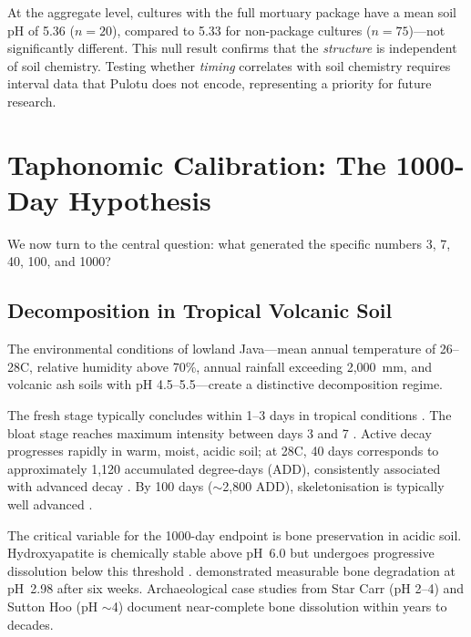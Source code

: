 \documentclass[12pt,a4paper]{article}
\begin{document}
At the aggregate level, cultures with the full mortuary package have a mean soil pH of 5.36 ($n = 20$), compared to 5.33 for non-package cultures ($n = 75$)---not significantly different. This null result confirms that the \textit{structure} is independent of soil chemistry. Testing whether \textit{timing} correlates with soil chemistry requires interval data that Pulotu does not encode, representing a priority for future research.


\section{Taphonomic Calibration: The 1000-Day Hypothesis}

We now turn to the central question: what generated the specific numbers 3, 7, 40, 100, and 1000?

\subsection{Decomposition in Tropical Volcanic Soil}

The environmental conditions of lowland Java---mean annual temperature of 26--28\textdegree C, relative humidity above 70\%, annual rainfall exceeding 2,000~mm, and volcanic ash soils with pH 4.5--5.5---create a distinctive decomposition regime.

The fresh stage typically concludes within 1--3 days in tropical conditions \citep{rodriguez_bass_1985, galloway_1997}. The bloat stage reaches maximum intensity between days 3 and 7 \citep{galloway_1989, vass_2001}. Active decay progresses rapidly in warm, moist, acidic soil; at 28\textdegree C, 40 days corresponds to approximately 1,120 accumulated degree-days (ADD), consistently associated with advanced decay \citep{megyesi_2005}. By 100 days ($\sim$2,800 ADD), skeletonisation is typically well advanced \citep{haglund_sorg_1997}.

The critical variable for the 1000-day endpoint is bone preservation in acidic soil. Hydroxyapatite is chemically stable above pH~6.0 but undergoes progressive dissolution below this threshold \citep{nielsen_marsh_2000}. \citet{oghenemavwe_2022} demonstrated measurable bone degradation at pH~2.98 after six weeks. Archaeological case studies from Star Carr (pH 2--4) and Sutton Hoo (pH $\sim$4) document near-complete bone dissolution within years to decades.
\end{document}
